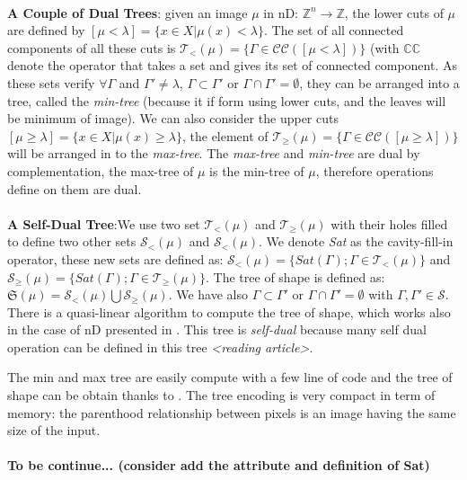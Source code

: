 \paragraph{} \textbf{A Couple of Dual Trees}: given an image $\mu $ in nD: $\mathbb{Z}^{n} \rightarrow \mathbb{Z} $, the lower cuts of $\mu$ are defined by 
	$[\mu < \lambda] =\lbrace x \in X \vert \mu (x) < \lambda \rbrace $. The set of all connected components of all these cuts is $ \mathcal{T}_< (\mu) =\lbrace \Gamma \in \mathcal{C}\mathcal{C}([\mu < \lambda]) \rbrace $ (with $\mathbb{C}\mathbb{C}$ denote the operator that takes a set and gives its set of connected component. As these sets verify $\forall \Gamma$ and $\Gamma ' \neq \lambda$, $\Gamma \subset \Gamma ' $ or $\Gamma \cap \Gamma '= \emptyset$, they can be arranged into a tree, called the \textit{min-tree} (because it if form using lower cuts, and the leaves will be minimum of image). We can also consider the upper cuts $[\mu \geq \lambda] =\lbrace x \in X \vert \mu (x) \geq \lambda \rbrace $, the element of $ \mathcal{T}_\geq (\mu) =\lbrace \Gamma \in \mathcal{C}\mathcal{C}([\mu \geq \lambda]) \rbrace $ will be arranged in to the \textit{max-tree}. The \textit{max-tree} and \textit{min-tree} are dual by complementation, the max-tree of $\mu$ is the min-tree of $ \mu$, therefore operations define on them are dual.
	
\paragraph{} \textbf{A Self-Dual Tree}:We use two set $ \mathcal{T}_< (\mu)$ and $ \mathcal{T}_\geq (\mu)$ with their holes filled to define two other sets $ \mathcal{S}_< (\mu)$ and $ \mathcal{S}_< (\mu)$. We denote \textit{Sat} as the cavity-fill-in operator, these new sets are defined as: $ \mathcal{S}_< (\mu) = \lbrace Sat(\Gamma);\Gamma \in \mathcal{T}_<(\mu)\rbrace$ and $ \mathcal{S}_\geq (\mu) = \lbrace Sat(\Gamma);\Gamma \in \mathcal{T}_\geq (\mu)\rbrace$. The tree of shape is defined as: $\mathfrak{S}(\mu) = \mathcal{S}_< (\mu) \bigcup \mathcal{S}_\geq (\mu) $. We have also $\Gamma \subset \Gamma ' $ or $\Gamma \cap \Gamma '= \emptyset$ with $\Gamma , \Gamma ' \in \mathcal{S}$. There is a quasi-linear algorithm to compute the tree of shape, which works also in the case of nD presented in \cite{geraud.13.ismm}. This tree is \textit{self-dual} because many self dual operation can be defined in this tree \textit{<reading article>}.

The min and max tree are easily compute with a few line of code \cite{berger.07.icip} and the tree of shape can be obtain thanks to \cite{geraud.13.ismm}. The tree encoding is very compact in term of memory: the parenthood relationship between pixels is an image having the same size of the input. 

	
\paragraph{To be continue... (consider add the attribute and definition of Sat)}
